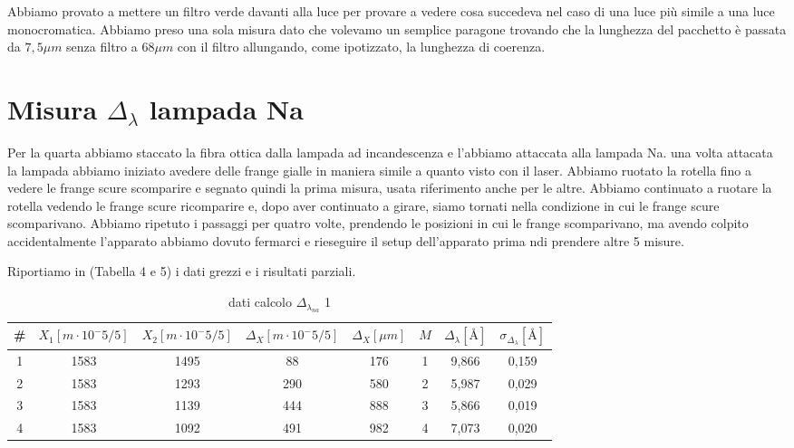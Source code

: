 \documentclass{article}
\begin{document}
Abbiamo provato a mettere un filtro verde davanti alla luce per provare a vedere cosa succedeva nel caso di una luce più simile a una luce monocromatica. Abbiamo preso una sola misura dato che volevamo un semplice paragone trovando che la lunghezza del pacchetto è passata da $7,5 \mu m$ senza filtro a $68 \mu m$ con il filtro allungando, come ipotizzato, la lunghezza di coerenza.




\section{Misura $\Delta_\lambda$ lampada  Na}
Per la quarta abbiamo staccato la fibra ottica dalla lampada ad incandescenza e l'abbiamo attaccata alla lampada Na. una volta attacata la lampada abbiamo iniziato avedere delle frange gialle in maniera simile a quanto visto con il laser. Abbiamo ruotato la rotella fino a vedere le frange scure scomparire e segnato quindi la prima misura, usata riferimento anche per le altre. Abbiamo continuato a ruotare la rotella vedendo le frange scure ricomparire e, dopo aver continuato a girare, siamo tornati nella condizione in cui le frange scure scomparivano. Abbiamo ripetuto i passaggi per quatro volte, prendendo le posizioni in cui le frange scomparivano, ma avendo colpito accidentalmente l'apparato abbiamo dovuto fermarci e rieseguire il setup dell'apparato prima ndi prendere altre 5 misure.

Riportiamo in (Tabella 4 e 5) i dati grezzi e i risultati parziali.

\begin{table}[h!]
\centering
\begin{tabular}{ | c | c | c | c | c | c | c | c |}
\hline
 \# & $X_1 [m \cdot 10^-5/5]$ & $X_2 [m \cdot 10^-5/5]$ & $\Delta_X [m \cdot 10^-5/5]$ & $\Delta_X [\mu m]$ & $M$ & $\Delta_\lambda [\textrm{Å}]$ & $\sigma_{\Delta_\lambda} [\textrm{Å}]$\\
\hline
   1 & 1583 & 1495 & 88 & 176 & 1 & 9,866 & 0,159\\
   2 & 1583 & 1293 & 290 & 580 & 2 & 5,987 & 0,029\\
   3 & 1583 & 1139 & 444 & 888 & 3 & 5,866 & 0,019\\
   4 & 1583 & 1092 & 491 & 982 & 4 & 7,073 & 0,020\\
\hline
\end{tabular}
\caption{dati calcolo $\Delta_{\lambda_{na}}$ 1}
\label{table:4}
\end{table}
\end{document}
